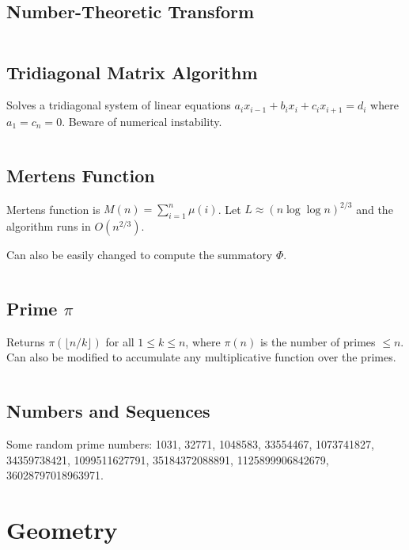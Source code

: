 \documentclass[9pt,a4paper,twocolumn,landscape,oneside]{amsart}
\newcommand{\code}[1]{\inputminted{cpp}{_code/#1}}
\newif\ifverbose
\begin{document}
    \subsection{Number-Theoretic Transform}
        \code{mathematics/ntt.cpp}

    \subsection{Tridiagonal Matrix Algorithm}
        Solves a tridiagonal system of linear equations $a_ix_{i-1} + b_ix_i +
        c_ix_{i+1} = d_i$ where $a_1 = c_n = 0$. Beware of numerical
        instability.
        \code{mathematics/tridiagonal.cpp}

    \subsection{Mertens Function}
        Mertens function is $M(n) = \sum_{i=1}^n \mu(i)$. Let $L\approx
        (n\log{\log{n}})^{2/3}$ and the algorithm runs in $O(n^{2/3})$.
        \ifverbose
        \else
            Can also be easily changed to compute the summatory $\Phi$.
        \fi
        \code{mathematics/mertens.cpp}
    \ifverbose
    \subsection{Summatory Phi}
        The summatory phi function $\Phi(n) = \sum_{i=1}^n \phi(i)$. Let $L\approx
        (n\log{\log{n}})^{2/3}$ and the algorithm runs in $O(n^{2/3})$.
        \code{mathematics/summatory_phi.cpp}
    \fi

    \subsection{Prime $\pi$}
        Returns $\pi\left(\lfloor n/k\rfloor\right)$ for all $1\leq k \leq n$,
        where $\pi(n)$ is the number of primes $\leq n$. Can also be modified
        to accumulate any multiplicative function over the primes.
        \code{mathematics/primepi.cpp}

    \subsection{Numbers and Sequences}
        Some random prime numbers: 1031, 32771, 1048583, 33554467,
        1073741827, 34359738421, 1099511627791, 35184372088891,
        1125899906842679, 36028797018963971.

\section{Geometry}
\end{document}
